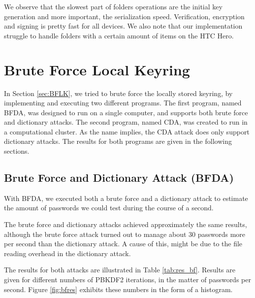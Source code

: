 \documentclass[pdftex,english,10pt,b5paper,twoside]{book}
\begin{document}





We observe that the slowest part of folders operations are the initial key
generation and more important, the serialization speed. Verification,
encryption and signing is pretty fast for all devices. We also note that our
implementation struggle to handle folders with a certain amount of items on the
HTC Hero.

\section{Brute Force Local Keyring}
\label{sec:R:BFLK}

In Section \ref{sec:BFLK}, we tried to brute force the locally stored keyring,
by implementing and executing two different programs. The first program, named
\acf{BFDA}, was designed to run on a single computer, and supports both brute
force and dictionary attacks. The second program, named \acf{CDA}, was created
to run in a computational cluster. As the name implies, the \ac{CDA} attack
does only support dictionary attacks. The results for both programs are given
in the following sections.

\subsection{Brute Force and Dictionary Attack (BFDA)}

With \ac{BFDA}, we executed both a brute force and a dictionary attack to
estimate the amount of passwords we could test during the course of a second.

The brute force and dictionary attacks achieved approximately the same results,
although the brute force attack turned out to manage about 30 passwords more
per second than the dictionary attack. A cause of this, might be due to the
file reading overhead in the dictionary attack. 

The results for both attacks are illustrated in Table \ref{tab:res_bf}. Results
are given for different numbers of \ac{PBKDF2} iterations, in the matter of
passwords per second. Figure \ref{fig:bfres} exhibits these numbers in the form
of a histogram.


\end{document}
